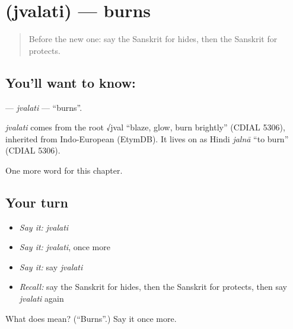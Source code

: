 \section[\texorpdfstring{\sk{ज्वलति} (jvalati)}{ज्वलति (jvalati)}]{ (jvalati) — burns}

\label{lesson:SA-C137-jvalati}



\begin{quote}
Before the new one: say the Sanskrit for hides, then the Sanskrit for protects.
\end{quote}

\subsection*{You'll want to know: }
\textbf{} — \emph{jvalati} — \textquotedblleft{}burns\textquotedblright{}.

\begin{cousinweb}
\emph{jvalati} comes from the root √jval \textquotedblleft{}blaze, glow, burn brightly\textquotedblright{} (CDIAL 5306), inherited from Indo-European (EtymDB). It lives on as Hindi \emph{jalnā} \textquotedblleft{}to burn\textquotedblright{} (CDIAL 5306).
\end{cousinweb}

\begin{grammarlens}[title={What you've built}]
One more word for this chapter.
\end{grammarlens}

\subsection*{Your turn}
\begin{itemize}
\raggedright
  \item \emph{Say it:} \emph{jvalati}
  \item \emph{Say it:} \emph{jvalati}, once more
  \item \emph{Say it:} say \emph{jvalati}
  \item \emph{Recall:} say the Sanskrit for hides, then the Sanskrit for protects, then say \emph{jvalati} again
\end{itemize}

\begin{tcolorbox}[breakable,colback=teal!4,colframe=teal!35!black,title={Before you move on}]
What does  mean? (\textquotedblleft{}Burns\textquotedblright{}.) Say it once more.
\end{tcolorbox}

